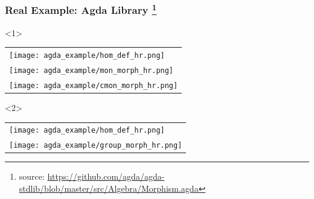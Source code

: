 \documentclass[t,12pt,numbers,fleqn,usenames,xcolor=dvipsnames]{beamer}
\begin{document}
\begin{frame}
\frametitle{Real Example: Agda Library
\footnote{\tiny{ source: 
\url{https://github.com/agda/agda-stdlib/blob/master/src/Algebra/Morphism.agda}}}}
\begin{onlyenv}<1>
	\begin{tabular}{l}	
		\texttt{[image: agda\_example/hom\_def\_hr.png]}\\		
		\texttt{[image: agda\_example/mon\_morph\_hr.png]}\\
		\texttt{[image: agda\_example/cmon\_morph\_hr.png]}\\		
	\end{tabular}	
\end{onlyenv}
\begin{onlyenv}<2>
	\begin{tabular}{l}	
		\texttt{[image: agda\_example/hom\_def\_hr.png]}\\		
		\texttt{[image: agda\_example/group\_morph\_hr.png]}	
	\end{tabular}	
\end{onlyenv}		
\end{frame}
\end{document}
